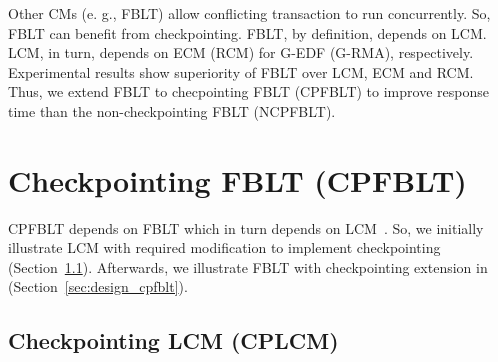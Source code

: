 \documentclass[conference]{IEEEtran}
\begin{document}
Other CMs (e. g., FBLT\cite{fblt}) allow conflicting transaction to run concurrently. So, FBLT can benefit from checkpointing. FBLT, by definition, depends on LCM. LCM, in turn, depends
on ECM (RCM) for G-EDF (G-RMA), respectively. Experimental results
show superiority of FBLT over LCM, ECM and RCM\cite{fblt}. Thus, we extend FBLT to checpointing FBLT (CPFBLT) to improve response time than the non-checkpointing FBLT (NCPFBLT).

\section{Checkpointing FBLT (CPFBLT)}\label{sec:cpfblt_design}

CPFBLT depends on FBLT which in turn depends on LCM~\cite{lcmdac2012}. So, we initially illustrate LCM with required modification to implement checkpointing (Section~\ref{sec:cplcm}). Afterwards, we illustrate FBLT with checkpointing extension in (Section~\ref{sec:design_cpfblt}).

\subsection{Checkpointing LCM (CPLCM)}\label{sec:cplcm}
\end{document}
